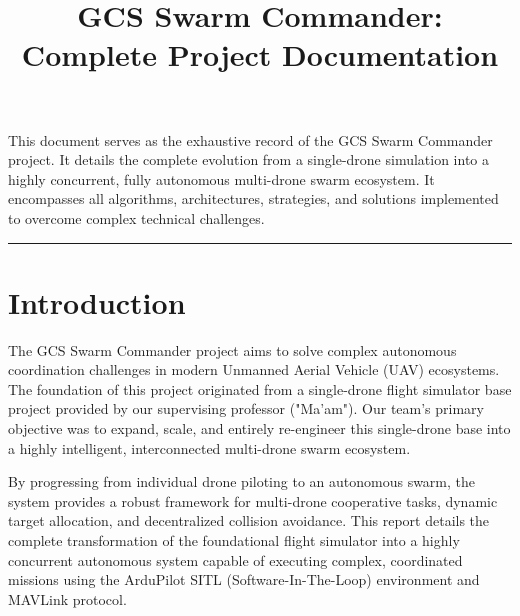 \documentclass[11pt,a4paper]{article}
\title{\textbf{GCS Swarm Commander: \\ Complete Project Documentation}}
\author{}
\date{}
\begin{document}
\maketitle
\thispagestyle{fancy}

\tableofcontents
\newpage

\noindent
This document serves as the exhaustive record of the GCS Swarm Commander project. It details the complete evolution from a single-drone simulation into a highly concurrent, fully autonomous multi-drone swarm ecosystem. It encompasses all algorithms, architectures, strategies, and solutions implemented to overcome complex technical challenges.

\vspace{0.5cm}
\hrule
\vspace{0.5cm}

\section{Introduction}
The GCS Swarm Commander project aims to solve complex autonomous coordination challenges in modern Unmanned Aerial Vehicle (UAV) ecosystems. The foundation of this project originated from a single-drone flight simulator base project provided by our supervising professor ("Ma'am"). Our team's primary objective was to expand, scale, and entirely re-engineer this single-drone base into a highly intelligent, interconnected multi-drone swarm ecosystem. 

By progressing from individual drone piloting to an autonomous swarm, the system provides a robust framework for multi-drone cooperative tasks, dynamic target allocation, and decentralized collision avoidance. This report details the complete transformation of the foundational flight simulator into a highly concurrent autonomous system capable of executing complex, coordinated missions using the ArduPilot SITL (Software-In-The-Loop) environment and MAVLink protocol.

\end{document}
